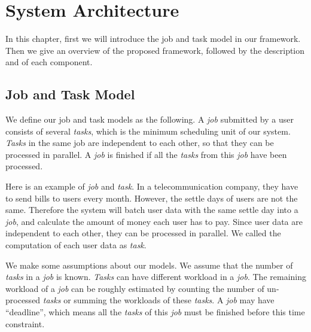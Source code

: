 \chapter{System Architecture}\label{sec:arch}

In this chapter, first we will introduce the job and task model in our
framework.
Then we give an overview of the proposed framework, followed by the
description and of each component.


\section{Job and Task Model}	%

We define our job and task models as the following.
A \emph{job} submitted by a user consists of several \emph{tasks}, which
is the minimum scheduling unit of our system.
\emph{Tasks} in the same job are independent to each other, so that they
can be processed in parallel.
A \emph{job} is finished if all the \emph{tasks} from this \emph{job} have
been processed.

Here is an example of \emph{job} and \emph{task}.
In a telecommunication company, they have to send bills to users every
month.
However, the settle days of users are not the same.
Therefore the system will batch user data with the same settle day into
a \emph{job}, and calculate the amount of money each user has to pay.
Since user data are independent to each other, they can be processed in
parallel.
We called the computation of each user data as \emph{task}.

We make some assumptions about our models.
We assume that the number of \emph{tasks} in a \emph{job} is known.
\emph{Tasks} can have different workload in a \emph{job}.
The remaining workload of a \emph{job} can be roughly estimated by
counting the number of un-processed \emph{tasks} or summing the workloads
of these \emph{tasks}.
A \emph{job} may have ``deadline'', which means all the \emph{tasks} of
this \emph{job} must be finished before this time constraint.




